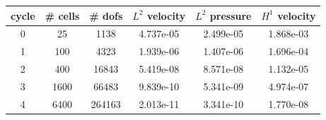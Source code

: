 \documentclass[10pt]{report}
\begin{document}
\begin{table}[H]
\begin{center}
\begin{tabular}{|c|c|c|c|c|c|} \hline
cycle & \# cells & \# dofs & $L^2$ velocity & $L^2$ pressure & $H^1$ velocity\\ \hline
0 & 25 & 1138 & 4.737e-05 & 2.499e-05 & 1.868e-03\\ \hline
1 & 100 & 4323 & 1.939e-06 & 1.407e-06 & 1.696e-04\\ \hline
2 & 400 & 16843 & 5.419e-08 & 8.571e-08 & 1.132e-05\\ \hline
3 & 1600 & 66483 & 9.839e-10 & 5.341e-09 & 4.974e-07\\ \hline
4 & 6400 & 264163 & 2.013e-11 & 3.341e-10 & 1.770e-08\\ \hline
\end{tabular}
\end{center}
\end{table}
\end{document}
